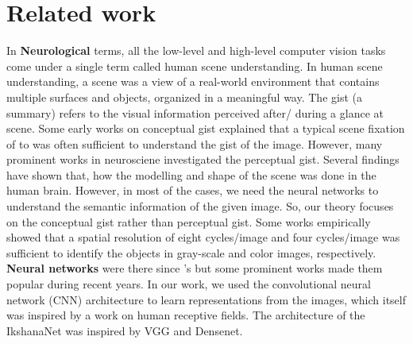 \documentclass{article}
\begin{document}
\section{Related work}
In \textbf{Neurological} terms, all the low-level and high-level computer vision tasks come under a single term called human scene understanding. 
In human scene understanding, a scene was a view of a real-world environment that contains multiple surfaces and objects, organized in a meaningful way. 
The gist (a summary) refers to the visual information perceived after/ during a glance at scene\cite{oliva2005gist}. Some early works\cite{potter1975meaning} \cite{intraub1981rapid} on conceptual gist explained that a typical scene fixation of  to  was often sufficient to understand the gist of the image. However, many prominent works \cite{rayner1998eye} \cite{schyns1994blobs}\cite{oliva2000diagnostic}\cite{oliva2001modeling}\cite{henderson2003human}\cite{evans2005perception}\cite{fei2007we} in neurosciene investigated the perceptual gist. Several findings have shown that, how the modelling and shape of the scene was done in the human brain. However, in most of the cases, we need the neural networks to understand the semantic information of the given image. So, our theory focuses on the conceptual gist rather than perceptual gist. Some works\cite{oliva2000diagnostic}\cite{oliva2001modeling} empirically showed that a spatial resolution of eight cycles/image and four cycles/image was sufficient to identify the objects in gray-scale and color images, respectively. \newline
\textbf{Neural networks} were there since 's\cite{mcculloch1943logical}\cite{rumelhart1986learning}\cite{rosenblatt1958perceptron}\cite{lin2013network} but some prominent works\cite{deng2009imagenet}\cite{krizhevsky25hinton}\cite{he2016deep} made them popular during recent years. In our work, we used the convolutional neural network (CNN) architecture\cite{lecun1998gradient} to learn representations from the images, which itself was inspired by a work on human receptive fields\cite{hubel1962receptive}. The architecture of the IkshanaNet was inspired by VGG\cite{7486599} and  Densenet\cite{huang2017densely}.\newline
\end{document}
